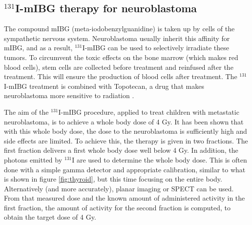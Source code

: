 \subsection{$^{131}$I-mIBG therapy for neuroblastoma}
The compound mIBG (meta-iodobenzylguanidine) is taken up by cells of
the sympathetic nervous system. Neuroblastoma usually inherit this
affinity for mIBG, and as a result, $^{131}$I-mIBG can be used to
selectively irradiate these tumors. To circumvent the toxic effects on
the bone marrow (which makes red blood cells), stem cells are
collected before treatment and reinfused after the treatment. This
will ensure the production of blood cells after treatment. The
$^{131}$I-mIBG treatment is combined with Topotecan, a drug that makes
neuroblastoma more sensitive to radiation \cite{Gaze2015}.

The aim of the $^{131}$I-mIBG procedure, applied to treat children
with metastatic neuroblastoma, is to achieve a whole body dose of 4
Gy. It has been shown that with this whole body dose, the dose to the
neuroblastoma is sufficiently high and side effects are limited. To
achieve this, the therapy is given in two fractions. The first
fraction delivers a first whole body dose well below 4 Gy. In
addition, the photons emitted by $^{131}$I are used to determine the
whole body dose. This is often done with a simple gamma detector and
appropriate calibration, similar to what is shown in figure
\ref{fig:thyroid}, but this time focusing on the entire
body. Alternatively (and more accurately), planar imaging or SPECT can
be used. From that measured dose and the known amount of administered
activity in the first fraction, the amount of activity for the second
fraction is computed, to obtain the target dose of 4 Gy.

